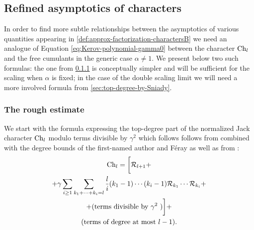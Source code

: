 \documentclass[12pt,usenames,dvipsnames,svgnames,table]{amsart}
\begin{document}
\subsection{Refined asymptotics of characters}
\label{subsec:refinedasymptotics}
In order to find more subtle relationships between the asymptotics of various
quantities appearing in \cref{def:approx-factorization-charactersB}
we need an analogue of Equation \eqref{eq:Kerov-polynomial-gamma0}
between the character $\operatorname{Ch}_l$ and the free cumulants in the generic case $\alpha\neq 1$.
We present below two such formulas: the one from \cref{sec:rough-estimate}
is conceptually simpler and will be sufficient for 
the scaling when $\alpha$ is fixed;
in the case of the double scaling limit we will need a more involved
formula from \cref{sec:top-degree-by-Sniady}.

\subsubsection{The rough estimate}
\label{sec:rough-estimate}

We start with the formula expressing the top-degree part of the
normalized Jack character $\operatorname{Ch}_l$ modulo terms divisible by $\gamma^2$
which follows follows from 
\cite[Section 11]{Lassalle2009} 
combined with the degree bounds of the first-named author and F\'eray
\cite[Proposition 3.7]{DolegaFeray2014}
as well as from \cite[Theorem A.3]{Sniady-AsymptoticsJack}:
\begin{multline}
\label{eq:kerov-polynomial-subtle}
\operatorname{Ch}_l=
\bigg[ \mathcal{R}_{l+1}+ \\
+\gamma \sum_{i\geq 1} \sum_{k_1+\cdots+k_i=l}
\frac{l}{i} 
(k_1-1) \cdots (k_i-1) \mathcal{R}_{k_1} \cdots \mathcal{R}_{k_i}+ \\
{+ (\text{terms divisible by $\gamma^2$ })\bigg]+ }
\\
(\text{terms of degree at most $l-1$}).
\end{multline}
\end{document}
